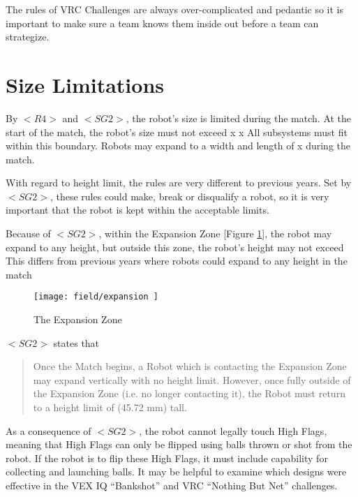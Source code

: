 \documentclass[../../main.tex]{subfiles}
\begin{document}
The rules of VRC Challenges are always over-complicated and pedantic so it is important to make sure a team knows them inside out before a team can strategize.

\section{Size Limitations}

By $<R4>$ and $<SG2>$, the robot’s size is limited during the match.
At the start of the match, the robot’s size must not exceed  x  x  All subsystems must fit within this boundary.
Robots may expand to a width and length of  x  during the match.
\par

With regard to height limit, the rules are very different to previous years.
Set by $<SG2>$, these rules could make, break or disqualify a robot, so it is very important that the robot is kept within the acceptable limits.
\par

Because of $<SG2>$, within the Expansion Zone [Figure \ref{fig:expansionzone}], the robot may expand to any height, but outside this zone, the robot’s height may not exceed  This differs from previous years where robots could expand to any height in the match \par 

\begin{figure}[h] \centering 

	\texttt{[image: field/expansion ]} \caption{The Expansion Zone} \label{fig:expansionzone} \end{figure} 

$<SG2>$ states that \begin{quotation} 

	Once the Match begins, a Robot which is contacting the Expansion Zone may expand vertically with no height limit.
	However, once fully outside of the Expansion Zone (i.e. no longer contacting it), the Robot must return to a height limit of  (45.72 mm) tall.
\end{quotation}

As a consequence of $<SG2>$, the robot cannot legally touch High Flags, meaning that High Flags can only be flipped using balls thrown or shot from the robot.
If the robot is to flip these High Flags, it must include capability for collecting and launching balls.
It may be helpful to examine which designs were effective in the VEX IQ “Bankshot” and VRC “Nothing But Net” challenges.
\end{document}

